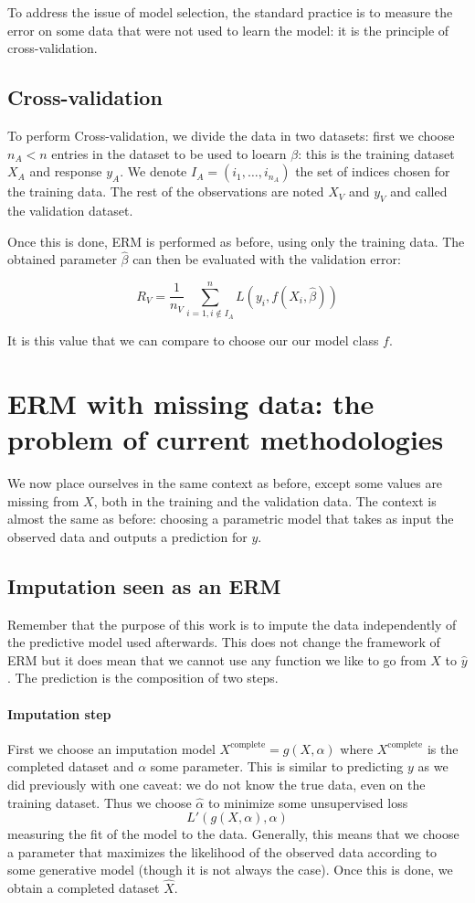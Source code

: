 \documentclass[12pt, a4paper]{memoir}
\begin{document}
To address the issue of model selection, the standard practice is to measure the error on some data that were not used to learn the model: it is the principle of cross-validation.

		\subsection{Cross-validation}
To perform Cross-validation, we divide the data in two datasets: first we choose $n_A < n$ entries in the dataset to be used to loearn $\beta$: this is the training dataset $X_A$ and response $y_A$. We denote $I_A = (i_1, \ldots, i_{n_A})$ the set of indices chosen for the training data. The rest of the observations are noted $X_V$ and $y_V$ and called the validation dataset.

Once this is done, ERM is performed as before, using only the training data. The obtained parameter $\hat{\beta}$ can then be evaluated with the validation error:

$$ R_{V} = \frac{1}{n_V} \sum\limits_{i=1, i \notin I_A}^n L(y_i, f(X_i, \hat{\beta}))$$

It is this value that we can compare to choose our our model class $f$.

	\section{ERM with missing data: the problem of current methodologies}
We now place ourselves in the same context as before, except some values are missing from $X$, both in the training and the validation data. The context is almost the same as before: choosing a parametric model that takes as input the observed data and outputs a prediction for $y$.
		\subsection{Imputation seen as an ERM}
Remember that the purpose of this work is to impute the data independently of the predictive model used afterwards. This does not change the framework of ERM but it does mean that we cannot use any function we like to go from $X$ to $\hat{y}$. The prediction is the composition of two steps.
			\paragraph{Imputation step}
First we choose an imputation model $X^{\text{complete}} = g(X, \alpha)$ where $X^{\text{complete}}$ is the completed dataset and $\alpha$ some parameter. This is similar to predicting $y$ as we did previously with one caveat: we do not know the true data, even on the training dataset. Thus we choose $\hat{\alpha}$ to minimize some unsupervised loss
$$L'(g(X, \alpha), \alpha)$$
 measuring the fit of the model to the data. Generally, this means that we choose a parameter that maximizes the likelihood of the observed data according to some generative model (though it is not always the case). Once this is done, we obtain a completed dataset $\hat{X}$.
\end{document}
